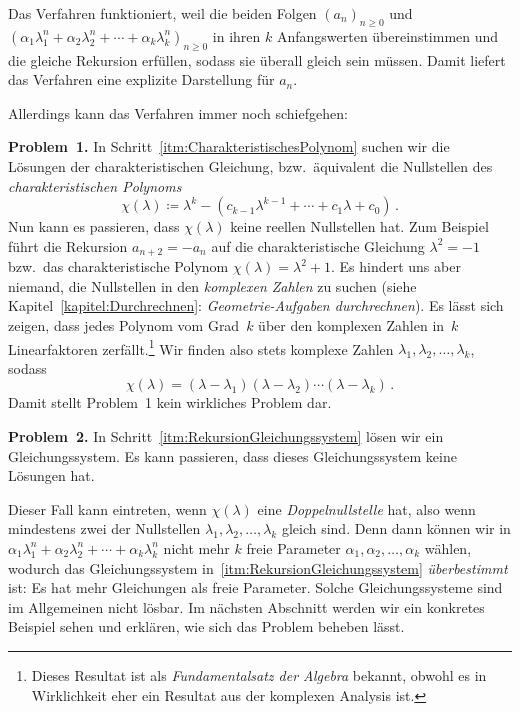 Das Verfahren funktioniert, weil die beiden Folgen $(a_n)_{n\geqslant 0}$ und $(\alpha_1\lambda_1^n+\alpha_2\lambda_2^n+\dotsb+\alpha_k\lambda_k^n)_{n\geqslant 0}$ in ihren $k$ Anfangswerten übereinstimmen und die gleiche Rekursion erfüllen, sodass sie überall gleich sein müssen. Damit liefert das Verfahren eine explizite Darstellung für $a_n$.

Allerdings kann das Verfahren immer noch schiefgehen: 


\textbf{Problem~1.} In Schritt~\ref{itm:CharakteristischesPolynom} suchen wir die Lösungen der charakteristischen Gleichung, bzw.\ äquivalent die Nullstellen des \emph{charakteristischen Polynoms}
\begin{equation*}
	\chi(\lambda)\coloneqq \lambda^k-(c_{k-1}\lambda^{k-1}+\dotsb+c_1\lambda+c_0)\,.
\end{equation*}
Nun kann es passieren, dass $\chi(\lambda)$ keine reellen Nullstellen hat. Zum Beispiel führt die Rekursion $a_{n+2}=-a_n$ auf die charakteristische Gleichung $\lambda^2=-1$ bzw.\ das charakteristische Polynom $\chi(\lambda)=\lambda^2+1$. Es hindert uns aber niemand, die Nullstellen in den \emph{komplexen Zahlen} zu suchen (siehe Kapitel~\ref{kapitel:Durchrechnen}: \emph{Geometrie-Aufgaben durchrechnen}). Es lässt sich zeigen, dass jedes Polynom vom Grad~$k$ über den komplexen Zahlen in~$k$ Linearfaktoren zerfällt.\footnote{Dieses Resultat ist als \emph{Fundamentalsatz der Algebra} bekannt, obwohl es in Wirklichkeit eher ein Resultat aus der komplexen Analysis ist.} Wir finden also stets komplexe Zahlen $\lambda_1,\lambda_2,\dotsc,\lambda_k$, sodass
\begin{equation*}
	\chi(\lambda)=(\lambda-\lambda_1)(\lambda-\lambda_2)\dotsm (\lambda-\lambda_k)\,.
\end{equation*}
Damit stellt Problem~1 kein wirkliches Problem dar.

\textbf{Problem~2.} In Schritt~\ref{itm:RekursionGleichungssystem} lösen wir ein Gleichungssystem. Es kann passieren, dass dieses Gleichungssystem keine Lösungen hat.

Dieser Fall kann eintreten, wenn $\chi(\lambda)$ eine \emph{Doppelnullstelle} hat, also wenn mindestens zwei der Nullstellen $\lambda_1,\lambda_2,\dotsc,\lambda_k$ gleich sind. Denn dann können wir in $\alpha_1\lambda_1^n+\alpha_2\lambda_2^n+\dotsb+\alpha_k\lambda_k^n$ nicht mehr $k$ freie Parameter $\alpha_1,\alpha_2,\dotsc,\alpha_k$ wählen, wodurch das Gleichungssystem in~\ref{itm:RekursionGleichungssystem} \emph{überbestimmt} ist: Es hat mehr Gleichungen als freie Parameter. Solche Gleichungssysteme sind im Allgemeinen nicht lösbar. Im nächsten Abschnitt werden wir ein konkretes Beispiel sehen und erklären, wie sich das Problem beheben lässt.

